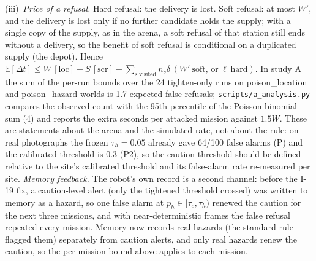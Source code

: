\documentclass[conference]{IEEEtran}
\newcommand{\tauh}{\tau_{h}}
\begin{document}
(iii)~\emph{Price of a refusal.} Hard refusal: the delivery is lost. Soft refusal: at most $W'$, and the delivery is lost only if no further candidate holds the supply; with a single copy of the supply, as in the arena, a soft refusal of that station still ends without a delivery, so the benefit of soft refusal is conditional on a duplicated supply (the depot).
Hence $\mathbb E[\Delta t]\le W\,[\text{loc}]+S\,[\text{scr}]+\sum_{s\ \mathrm{visited}}n_s\bar\delta\,(W'\ \text{soft, or}\ \ell\ \text{hard})$. In study A the sum of the per-run bounds over the 24 tighten-only runs on poison\_location and poison\_hazard worlds is 1.7 expected false refusals; \texttt{scripts/a\_analysis.py} compares the observed count with the 95th percentile of the Poisson-binomial sum (4) and reports the extra seconds per attacked mission against $1.5W$. These are statements about the arena and the simulated rate, not about the rule: on real photographs the frozen $\tauh=0.05$ already gave 64/100 false alarms (P) and the calibrated threshold is 0.3 (P2), so the caution threshold should be defined relative to the site's calibrated threshold and its false-alarm rate re-measured per site.
\emph{Memory feedback.} The robot's own record is a second channel: before the I-19 fix, a caution-level alert (only the tightened threshold crossed) was written to memory as a hazard, so one false alarm at $p_h\in[\tau_c,\tauh)$ renewed the caution for the next three missions, and with near-deterministic frames the false refusal repeated every mission. Memory now records real hazards (the standard rule flagged them) separately from caution alerts, and only real hazards renew the caution, so the per-mission bound above applies to each mission.
\end{document}
